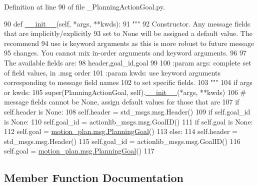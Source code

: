 Definition at line 90 of file \+\_\+\+Planning\+Action\+Goal.\+py.


\begin{DoxyCode}
90   \textcolor{keyword}{def }\hyperlink{classstate__machine_1_1Play_a5993a23d8be7f7b2647f71ede0334957}{\_\_init\_\_}(self, *args, **kwds):
91     \textcolor{stringliteral}{"""}
92 \textcolor{stringliteral}{    Constructor. Any message fields that are implicitly/explicitly}
93 \textcolor{stringliteral}{    set to None will be assigned a default value. The recommend}
94 \textcolor{stringliteral}{    use is keyword arguments as this is more robust to future message}
95 \textcolor{stringliteral}{    changes.  You cannot mix in-order arguments and keyword arguments.}
96 \textcolor{stringliteral}{}
97 \textcolor{stringliteral}{    The available fields are:}
98 \textcolor{stringliteral}{       header,goal\_id,goal}
99 \textcolor{stringliteral}{}
100 \textcolor{stringliteral}{    :param args: complete set of field values, in .msg order}
101 \textcolor{stringliteral}{    :param kwds: use keyword arguments corresponding to message field names}
102 \textcolor{stringliteral}{    to set specific fields.}
103 \textcolor{stringliteral}{    """}
104     \textcolor{keywordflow}{if} args \textcolor{keywordflow}{or} kwds:
105       super(PlanningActionGoal, self).\hyperlink{classstate__machine_1_1Play_a5993a23d8be7f7b2647f71ede0334957}{\_\_init\_\_}(*args, **kwds)
106       \textcolor{comment}{# message fields cannot be None, assign default values for those that are}
107       \textcolor{keywordflow}{if} self.header \textcolor{keywordflow}{is} \textcolor{keywordtype}{None}:
108         self.header = std\_msgs.msg.Header()
109       \textcolor{keywordflow}{if} self.goal\_id \textcolor{keywordflow}{is} \textcolor{keywordtype}{None}:
110         self.goal\_id = actionlib\_msgs.msg.GoalID()
111       \textcolor{keywordflow}{if} self.goal \textcolor{keywordflow}{is} \textcolor{keywordtype}{None}:
112         self.goal = \hyperlink{classmotion__plan_1_1msg_1_1__PlanningGoal_1_1PlanningGoal}{motion\_plan.msg.PlanningGoal}()
113     \textcolor{keywordflow}{else}:
114       self.header = std\_msgs.msg.Header()
115       self.goal\_id = actionlib\_msgs.msg.GoalID()
116       self.goal = \hyperlink{classmotion__plan_1_1msg_1_1__PlanningGoal_1_1PlanningGoal}{motion\_plan.msg.PlanningGoal}()
117 
\end{DoxyCode}


\subsection{Member Function Documentation}
\mbox{\label{classmotion__plan_1_1msg_1_1__PlanningActionGoal_1_1PlanningActionGoal_a65f2963dc39d9877fc86227519e90d10}} 
